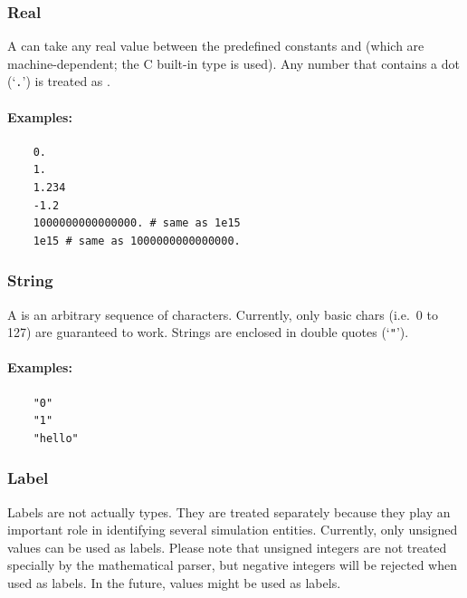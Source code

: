 \subsubsection{Real}
\label{sec:real}
A  can take any real value between the predefined constants
 and  (which are machine-dependent; the C built-in type  is used).
Any number that contains a dot (`\texttt{.}') is treated as .

\paragraph{Examples:}
\begin{verbatim}
    0.
    1.
    1.234
    -1.2
    1000000000000000. # same as 1e15
    1e15 # same as 1000000000000000.
\end{verbatim}

\subsubsection{String}
\label{sec:string}
A  is an arbitrary sequence of characters.
Currently, only basic chars (i.e.\ 0 to 127) are guaranteed to work.
Strings are enclosed in double quotes (`\texttt{"}').

\paragraph{Examples:}
\begin{verbatim}
    "0"
    "1"
    "hello"
\end{verbatim}

\subsubsection{Label}
\label{sec:label}
Labels are not actually types.
They are treated separately because they play an important role in identifying several simulation entities.
Currently, only unsigned  values can be used as labels.
Please note that unsigned integers are not treated specially by the mathematical parser,
but negative integers will be rejected when used as labels.
In the future,  values might be used as labels.


